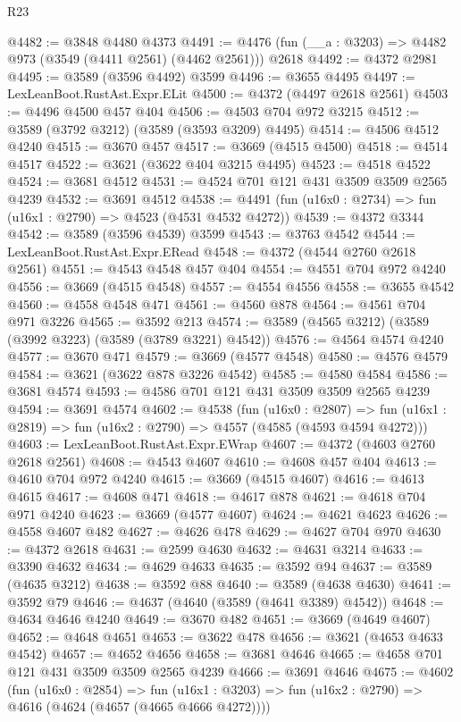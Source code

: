 \begin{lexlean}{R23}
\begin{coremodule}
@4482 := @3848 @4480 @4373
@4491 := @4476 (fun (__a : @3203) => @4482 @973 (@3549 (@4411 @2561) (@4462 @2561))) @2618
@4492 := @4372 @2981
@4495 := @3589 (@3596 @4492) @3599
@4496 := @3655 @4495
@4497 := LexLeanBoot.RustAst.Expr.ELit
@4500 := @4372 (@4497 @2618 @2561)
@4503 := @4496 @4500 @457 @404
@4506 := @4503 @704 @972 @3215
@4512 := @3589 (@3792 @3212) (@3589 (@3593 @3209) @4495)
@4514 := @4506 @4512 @4240
@4515 := @3670 @457
@4517 := @3669 (@4515 @4500)
@4518 := @4514 @4517
@4522 := @3621 (@3622 @404 @3215 @4495)
@4523 := @4518 @4522
@4524 := @3681 @4512
@4531 := @4524 @701 @121 @431 @3509 @3509 @2565 @4239
@4532 := @3691 @4512
@4538 := @4491 (fun (u16x0 : @2734) => fun (u16x1 : @2790) => @4523 (@4531 @4532 @4272))
@4539 := @4372 @3344
@4542 := @3589 (@3596 @4539) @3599
@4543 := @3763 @4542
@4544 := LexLeanBoot.RustAst.Expr.ERead
@4548 := @4372 (@4544 @2760 @2618 @2561)
@4551 := @4543 @4548 @457 @404
@4554 := @4551 @704 @972 @4240
@4556 := @3669 (@4515 @4548)
@4557 := @4554 @4556
@4558 := @3655 @4542
@4560 := @4558 @4548 @471
@4561 := @4560 @878
@4564 := @4561 @704 @971 @3226
@4565 := @3592 @213
@4574 := @3589 (@4565 @3212) (@3589 (@3992 @3223) (@3589 (@3789 @3221) @4542))
@4576 := @4564 @4574 @4240
@4577 := @3670 @471
@4579 := @3669 (@4577 @4548)
@4580 := @4576 @4579
@4584 := @3621 (@3622 @878 @3226 @4542)
@4585 := @4580 @4584
@4586 := @3681 @4574
@4593 := @4586 @701 @121 @431 @3509 @3509 @2565 @4239
@4594 := @3691 @4574
@4602 := @4538
    (fun (u16x0 : @2807) =>
    fun (u16x1 : @2819) => fun (u16x2 : @2790) => @4557 (@4585 (@4593 @4594 @4272)))
@4603 := LexLeanBoot.RustAst.Expr.EWrap
@4607 := @4372 (@4603 @2760 @2618 @2561)
@4608 := @4543 @4607
@4610 := @4608 @457 @404
@4613 := @4610 @704 @972 @4240
@4615 := @3669 (@4515 @4607)
@4616 := @4613 @4615
@4617 := @4608 @471
@4618 := @4617 @878
@4621 := @4618 @704 @971 @4240
@4623 := @3669 (@4577 @4607)
@4624 := @4621 @4623
@4626 := @4558 @4607 @482
@4627 := @4626 @478
@4629 := @4627 @704 @970
@4630 := @4372 @2618
@4631 := @2599 @4630
@4632 := @4631 @3214
@4633 := @3390 @4632
@4634 := @4629 @4633
@4635 := @3592 @94
@4637 := @3589 (@4635 @3212)
@4638 := @3592 @88
@4640 := @3589 (@4638 @4630)
@4641 := @3592 @79
@4646 := @4637 (@4640 (@3589 (@4641 @3389) @4542))
@4648 := @4634 @4646 @4240
@4649 := @3670 @482
@4651 := @3669 (@4649 @4607)
@4652 := @4648 @4651
@4653 := @3622 @478
@4656 := @3621 (@4653 @4633 @4542)
@4657 := @4652 @4656
@4658 := @3681 @4646
@4665 := @4658 @701 @121 @431 @3509 @3509 @2565 @4239
@4666 := @3691 @4646
@4675 := @4602
    (fun (u16x0 : @2854) =>
    fun (u16x1 : @3203) => fun (u16x2 : @2790) => @4616 (@4624 (@4657 (@4665 @4666 @4272))))

\end{coremodule}
\end{lexlean}
